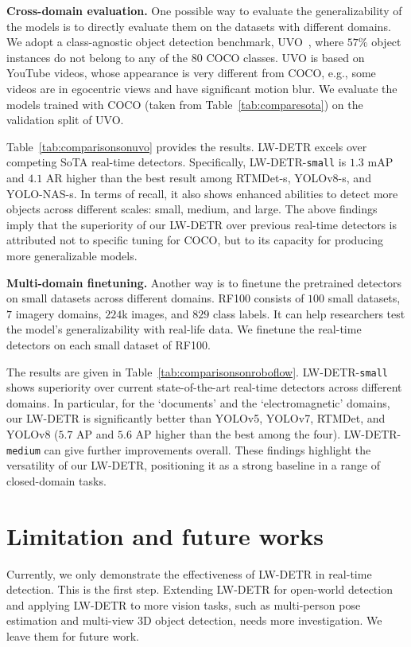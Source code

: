 \documentclass[runningheads]{llncs}
\begin{document}
\vspace{1mm}
\noindent\textbf{Cross-domain evaluation.} One possible way to evaluate the generalizability of the models is to directly evaluate them on the datasets with different domains. We adopt a class-agnostic object detection benchmark, UVO~\cite{wang2021unidentified}, where $57\%$ object instances do not belong to any of the $80$ COCO classes. UVO is based on YouTube videos, whose appearance is very different from COCO, e.g., some videos are in egocentric views and have significant motion blur. We evaluate the models trained with COCO (taken from Table~\ref{tab:comparesota}) on the validation split of UVO.

Table~\ref{tab:comparisonsonuvo} provides the results. LW-DETR excels over competing SoTA real-time detectors. Specifically, LW-DETR-\texttt{small} is $1.3$ mAP and $4.1$ AR higher than the best result among RTMDet-s, YOLOv8-s, and YOLO-NAS-s. In terms of recall, it also shows enhanced abilities to detect more objects across different scales: small, medium, and large. The above findings imply that the superiority of our LW-DETR over previous real-time detectors is attributed not to specific tuning for COCO, but to its capacity for producing more generalizable models.

\vspace{1mm}
\noindent\textbf{Multi-domain finetuning.} 
Another way is to finetune the pretrained detectors on small datasets across different domains. RF100 consists of $100$ small datasets, $7$ imagery domains,
$224$k images, and $829$ class labels. It can help researchers test the model's generalizability with real-life data. We finetune the real-time detectors on each small dataset of RF100. 

The results are given in Table~\ref{tab:comparisonsonroboflow}.
LW-DETR-\texttt{small} shows superiority over current state-of-the-art real-time detectors across different domains. In particular, for the `documents' and the `electromagnetic' domains, our LW-DETR is significantly better than YOLOv5, YOLOv7, RTMDet, and YOLOv8 ($5.7$ AP and $5.6$ AP higher than the best among the four). LW-DETR-\texttt{medium} can give further improvements overall. These findings highlight the versatility of our LW-DETR, positioning it as a strong baseline in a range of closed-domain tasks.

\section{Limitation and future works}
Currently, we only demonstrate the effectiveness of LW-DETR in real-time detection. This is the first step. Extending LW-DETR for open-world detection and applying LW-DETR to more vision tasks, such as multi-person pose estimation and multi-view 3D object detection, needs more investigation. We leave them for future work.
\end{document}
